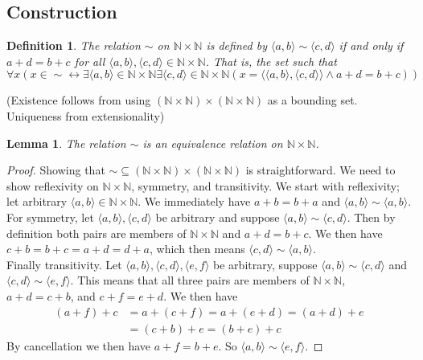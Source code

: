 \documentclass{report}
\newtheorem{lemma}[theo]{Lemma}
\newtheorem{definition}[theo]{Definition}
\begin{document}
\subsection{Construction}
\begin{definition}
The relation $\sim$ on $\mathbb N\times\mathbb N$ is defined by $\langle a,b\rangle\sim\langle c,d\rangle$ 
if and only if $a+d=b+c$ for all $\langle a,b\rangle,\langle c,d\rangle\in\mathbb N\times\mathbb N$. That is, the set such that
\begin{equation*}
\forall x(x\in\sim\leftrightarrow\exists\langle a,b\rangle\in\mathbb N\times\mathbb N\exists\langle c,d\rangle\in\mathbb N\times\mathbb N
(x=\langle\langle a,b\rangle,\langle c,d\rangle\rangle\land a+d=b+c))
\end{equation*}
\end{definition}
\noindent(Existence follows from using $(\mathbb N\times\mathbb N)\times(\mathbb N\times\mathbb N)$ as a bounding set. 
Uniqueness from extensionality)
\begin{lemma}
The relation $\sim$ is an equivalence relation on $\mathbb N\times\mathbb N$.
\end{lemma}
\begin{proof}
Showing that $\sim\subseteq(\mathbb N\times\mathbb N)\times(\mathbb N\times\mathbb N)$ is straightforward. We need to show reflexivity on $\mathbb N\times\mathbb N$,
symmetry, and transitivity. We start with reflexivity; let arbitrary $\langle a,b\rangle\in\mathbb N\times\mathbb N$.
We immediately have $a+b=b+a$ and $\langle a,b\rangle\sim\langle a,b\rangle$. For symmetry, let $\langle a,b\rangle,\langle c,d\rangle$ be arbitrary and suppose 
$\langle a,b\rangle\sim\langle c,d\rangle$. Then by definition both pairs are members of $\mathbb N\times\mathbb N$ and $a+d=b+c$. 
We then have $c+b=b+c=a+d=d+a$, which then means $\langle c,d\rangle\sim\langle a,b\rangle$.\\
\indent Finally transitivity. Let $\langle a,b\rangle,\langle c,d\rangle,\langle e,f\rangle$ be arbitrary, suppose $\langle a,b\rangle\sim\langle c,d\rangle$ and 
$\langle c,d\rangle\sim\langle e,f\rangle$. This means that all three pairs are members of $\mathbb N\times\mathbb N$, $a+d=c+b$, and $c+f=e+d$. We then have
\begin{align*}
(a+f)+c&=a+(c+f)=a+(e+d)=(a+d)+e\\
&=(c+b)+e=(b+e)+c
\end{align*}
By cancellation we then have $a+f=b+e$. So $\langle a,b\rangle\sim\langle e,f\rangle$.
\end{proof}
\end{document}
